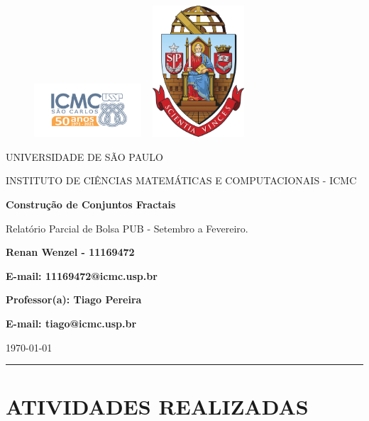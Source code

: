 \documentclass{article}
\theoremstyle{definition}
\begin{document}
\begin{figure}[ht]
	\includegraphics[width=4cm]{../icmc.png}
	\hspace{7cm}
	\includegraphics[height=4.9cm,width=4cm]{../brasao_usp_cor.jpg}
	\endminipage
\end{figure}

\begin{center}
	\vspace{1cm}
	\LARGE
	UNIVERSIDADE DE SÃO PAULO

	\vspace{1.3cm}
	\LARGE
	INSTITUTO DE CIÊNCIAS MATEMÁTICAS E COMPUTACIONAIS - ICMC

	\vspace{1.7cm}
	\Large
	\textbf{Construção de Conjuntos Fractais}

	Relatório Parcial de Bolsa PUB - Setembro a Fevereiro.

	\vspace{1.3cm}
	\large
	\textbf{Renan Wenzel - 11169472}

	\textbf{E-mail: 11169472@icmc.usp.br}

	\vspace{1.3cm}
	\large
	\textbf{Professor(a): Tiago Pereira}

	\textbf{E-mail: tiago@icmc.usp.br}

	\vspace{1.3cm}
	\today
\end{center}

\hrule
\vspace{1.3cm}

\section*{ATIVIDADES REALIZADAS}
\end{document}

